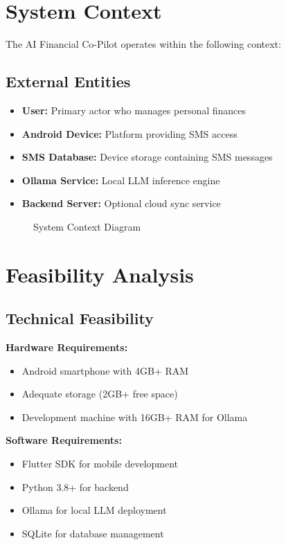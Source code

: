 \documentclass[11pt,a4paper]{report}
\begin{document}
\section{System Context}

The AI Financial Co-Pilot operates within the following context:

\subsection{External Entities}

\begin{itemize}
    \item \textbf{User:} Primary actor who manages personal finances
    \item \textbf{Android Device:} Platform providing SMS access
    \item \textbf{SMS Database:} Device storage containing SMS messages
    \item \textbf{Ollama Service:} Local LLM inference engine
    \item \textbf{Backend Server:} Optional cloud sync service
\end{itemize}

\begin{figure}[htbp]
    \centering
    \caption{System Context Diagram}
    \label{fig:context}
\end{figure}

\section{Feasibility Analysis}

\subsection{Technical Feasibility}

\textbf{Hardware Requirements:}
\begin{itemize}
    \item Android smartphone with 4GB+ RAM
    \item Adequate storage (2GB+ free space)
    \item Development machine with 16GB+ RAM for Ollama
\end{itemize}

\textbf{Software Requirements:}
\begin{itemize}
    \item Flutter SDK for mobile development
    \item Python 3.8+ for backend
    \item Ollama for local LLM deployment
    \item SQLite for database management
\end{itemize}
\end{document}
